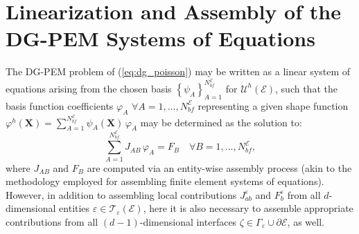 \section{Linearization and Assembly of the \\ DG-PEM Systems of Equations}

	The DG-PEM problem of (\ref{eq:dg_poisson}) may be written as a linear system of equations arising from the chosen basis $\left\{ \psi_A \right\}_{A=1}^{N^\mathcal{E}_{bf}}$ for $\mathcal{U}^h (\mathcal{E})$, such that the basis function coefficients $\varphi_A \, \, \forall A = 1, \ldots, N^\mathcal{E}_{bf}$ representing a given shape function $\varphi^h (\mathbf{X}) = \sum_{A=1}^{N^\mathcal{E}_{bf}} \psi_A (\mathbf{X}) \, \varphi_A$ may be determined as the solution to:
	\begin{equation}
		\sum_{A=1}^{N^\mathcal{E}_{bf}} J_{AB} \, \varphi_A = F_B \quad \forall B = 1, \ldots, N^\mathcal{E}_{bf},
		\label{eq:linearization_dgpem}
	\end{equation}
	where $J_{AB}$ and $F_B$ are computed via an entity-wise assembly process (akin to the methodology employed for assembling finite element systems of equations). However, in addition to assembling local contributions $J^\varepsilon_{ab}$ and $F^\varepsilon_b$ from all $d$-dimensional entities $\varepsilon \in \mathcal{T}_\varepsilon (\mathcal{E})$, here it is also necessary to assemble appropriate contributions from all $(d-1)$-dimensional interfaces $\zeta \in \Gamma_\varepsilon \cup \partial \mathcal{E}$, as well.

